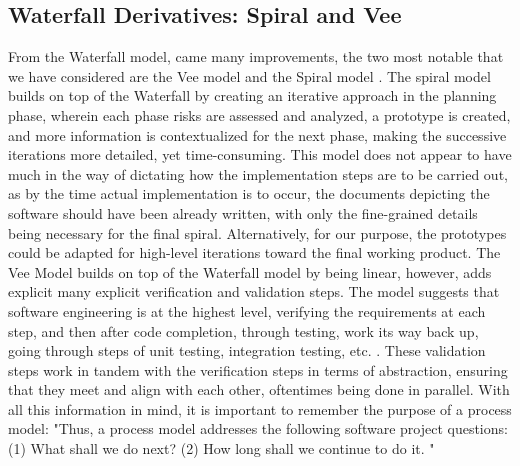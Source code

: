 \subsection{Waterfall Derivatives: Spiral and Vee}
From the Waterfall model, came many improvements, the two most notable that we have considered are the Vee model and the Spiral model \cite{spiralmode;} \cite{geeksforgeeks_2023}. The spiral model builds on top of the Waterfall by creating an iterative approach in the planning phase, wherein each phase risks are assessed and analyzed, a prototype is created, and more information is contextualized for the next phase, making the successive iterations more detailed, yet time-consuming. This model does not appear to have much in the way of dictating how the implementation steps are to be carried out, as by the time actual implementation is to occur, the documents depicting the software should have been already written, with only the fine-grained details being necessary for the final spiral. Alternatively, for our purpose, the prototypes could be adapted for high-level iterations toward the final working product. The Vee Model builds on top of the Waterfall model by being linear, however, adds explicit many explicit verification and validation steps. The model suggests that software engineering is at the highest level, verifying the requirements at each step, and then after code completion, through testing, work its way back up, going through steps of unit testing, integration testing, etc. \cite{geeksforgeeks_2023}. These validation steps work in tandem with the verification steps in terms of abstraction, ensuring that they meet and align with each other, oftentimes being done in parallel. With all this information in mind, it is important to remember the purpose of a process model: "Thus, a process model addresses the following software project questions: (1) What shall we do next? (2) How long shall we continue to do it. \cite{spiralmode;}"

